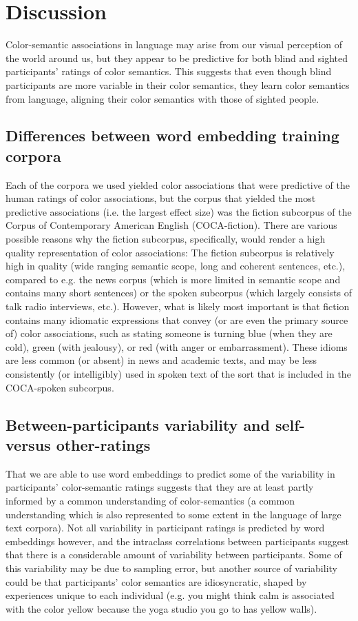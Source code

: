 \documentclass[10pt,letterpaper]{article}
\begin{document}
\section{Discussion}
Color-semantic associations in language may arise from our visual perception of the world around us, but they appear to be predictive for both blind and sighted participants' ratings of color semantics. This suggests that even though blind participants are more variable in their color semantics, they learn color semantics from language, aligning their color semantics with those of sighted people.

\subsection{Differences between word embedding training corpora}
Each of the corpora we used yielded color associations that were predictive of the human ratings of color associations, but the corpus that yielded the most predictive associations (i.e. the largest effect size) was the fiction subcorpus of the Corpus of Contemporary American English (COCA-fiction). There are various possible reasons why the fiction subcorpus, specifically, would render a high quality representation of color associations: The fiction subcorpus is relatively high in quality (wide ranging semantic scope, long and coherent sentences, etc.), compared to e.g. the news corpus (which is more limited in semantic scope and contains many short sentences) or the spoken subcorpus (which largely consists of talk radio interviews, etc.). However, what is likely most important is that fiction contains many idiomatic expressions that convey (or are even the primary source of) color associations, such as stating someone is turning blue (when they are cold), green (with jealousy), or red (with anger or embarrassment). These idioms are less common (or absent) in news and academic texts, and may be less consistently (or intelligibly) used in spoken text of the sort that is included in the COCA-spoken subcorpus.

\subsection{Between-participants variability and self- versus other-ratings}
That we are able to use word embeddings to predict some of the variability in participants' color-semantic ratings suggests that they are at least partly informed by a common understanding of color-semantics (a common understanding which is also represented to some extent in the language of large text corpora). Not all variability in participant ratings is predicted by word embeddings however, and the intraclass correlations between participants suggest that there is a considerable amount of variability between participants. Some of this variability may be due to sampling error, but another source of variability could be that participants' color semantics are idiosyncratic, shaped by experiences unique to each individual (e.g. you might think calm is associated with the color yellow because the yoga studio you go to has yellow walls).
\end{document}
